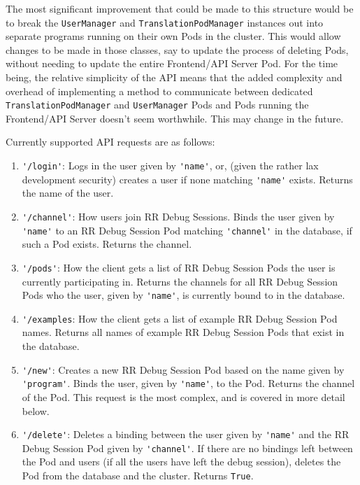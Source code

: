 \documentclass[12pt]{article}
\begin{document}
The most significant improvement that could be made to this structure
would be to break the \lstinline{UserManager} and
\lstinline{TranslationPodManager} instances out into separate programs
running on their own Pods in the cluster.  This would allow changes to
be made in those classes, say to update the process of deleting Pods,
without needing to update the entire Frontend/API Server Pod.  For the
time being, the relative simplicity of the API means that the added
complexity and overhead of implementing a method to communicate
between dedicated \lstinline{TranslationPodManager} and
\lstinline{UserManager} Pods and Pods running the Frontend/API Server
doesn't seem worthwhile.  This may change in the future.
\par

Currently supported API requests are as follows:

\begin{enumerate}
\item \lstinline{'/login'}: Logs in the user given by
  \lstinline{'name'}, or, (given the rather lax development security)
  creates a user if none matching \lstinline{'name'} exists.  Returns
  the name of the user.
\item \lstinline{'/channel'}: How users join RR Debug Sessions.  Binds
  the user given by \lstinline{'name'} to an RR Debug Session Pod
  matching \lstinline{'channel'} in the database, if such a Pod
  exists.  Returns the channel.
\item \lstinline{'/pods'}: How the client gets a list of RR Debug
  Session Pods the user is currently participating in.  Returns the
  channels for all RR Debug Session Pods who the user, given by
  \lstinline{'name'}, is currently bound to in the database.
\item \lstinline{'/examples}: How the client gets a list of example RR
  Debug Session Pod names.  Returns all names of example RR Debug
  Session Pods that exist in the database.
\item \lstinline{'/new'}: Creates a new RR Debug Session Pod based on
  the name given by \lstinline{'program'}.  Binds the user, given by
  \lstinline{'name'}, to the Pod.  Returns the channel of the Pod.
  This request is the most complex, and is covered in more detail
  below.
\item \lstinline{'/delete'}: Deletes a binding between the user given
  by \lstinline{'name'} and the RR Debug Session Pod given by
  \lstinline{'channel'}.  If there are no bindings left between the
  Pod and users (if all the users have left the debug session),
  deletes the Pod from the database and the cluster.  Returns
  \lstinline{True}.
\end{enumerate}
\end{document}
